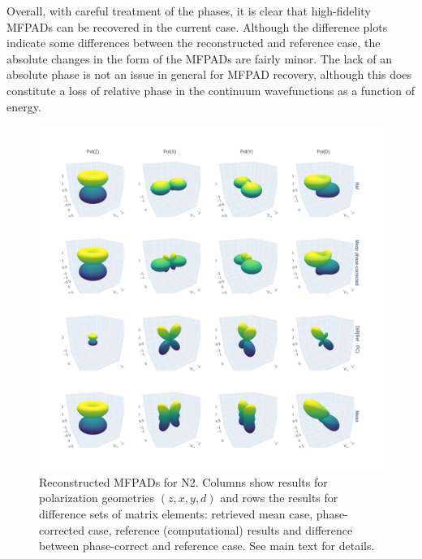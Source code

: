 \documentclass[10pt]{article}
\begin{document}
Overall, with careful treatment of the phases, it is clear that high-fidelity MFPADs can be recovered in the current case. Although the difference plots indicate some differences between the reconstructed and reference case, the absolute changes in the form of the MFPADs are fairly minor. The lack of an absolute phase is not an issue in general for MFPAD recovery, although this does constitute a loss of relative phase in the continuum wavefunctions as a function of energy. %


\begin{figure}[]
\begin{center}
\includegraphics[width=\textwidth,height=\dimexpr\textheight-4\baselineskip-\abovecaptionskip-\belowcaptionskip\relax,keepaspectratio]{figures/dataDump_1000fitTests_multiFit_noise_051021_MFPADs_250422.png}
\caption{Reconstructed MFPADs for N2. Columns show results for polarization geometries \((z,x,y,d)\) and rows the results for difference sets of matrix elements: retrieved mean case, phase-corrected case, reference (computational) results and difference between phase-correct and reference case. See main text for details.\label{454268}}
\end{center}
\end{figure}
\end{document}
